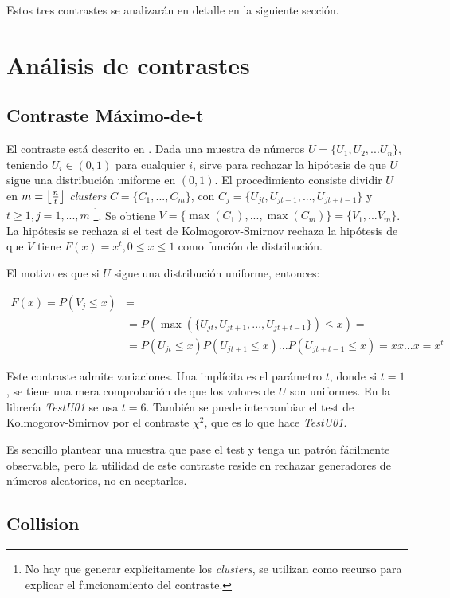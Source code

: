 \documentclass{article}
\DeclarePairedDelimiter\floor{\lfloor}{\rfloor}
\begin{document}
Estos tres contrastes se analizarán en detalle en la siguiente sección.

\section{Análisis de contrastes}

\label{sec:anal}

\subsection{Contraste Máximo-de-t}

El contraste está descrito en \citet{knuth2014art}. Dada una muestra de números \(U=\{U_1,U_2,...U_n\}\), teniendo \(U_i \in (0, 1)\) para cualquier \(i\), sirve para rechazar la hipótesis de que \(U\) sigue una distribución uniforme en \((0,1)\). El procedimiento consiste dividir \(U\) en \(m=\floor*{\frac{n}{t}}\) \emph{clusters} \(C=\{C_1,...,C_m\}\), con \(C_j=\{U_{jt},U_{jt+1},...,U_{jt+t-1}\}\) y \(t\ge1, j=1,...,m\) \footnote{No hay que generar explícitamente los \emph{clusters}, se utilizan como recurso para explicar el funcionamiento del contraste.}. Se obtiene \(V=\{\max(C_1),...,\max(C_m)\}=\{V_1,...V_m\}\). La hipótesis se rechaza si el test de Kolmogorov-Smirnov rechaza la hipótesis de que \(V\) tiene \(F(x)=x^t, 0\le x\le 1\) como función de distribución.

El motivo es que si \(U\) sigue una distribución uniforme, entonces:

\begin{align*}
    F(x)=P(V_j \le x)&=\\
                &=P(\max(\{U_{jt},U_{jt+1},...,U_{jt+t-1}\})\le x)=\\
                &=P(U_{jt}\le x)P(U_{jt+1}\le x)...P(U_{jt+t-1}\le x)=xx...x=x^t
\end{align*}

Este contraste admite variaciones. Una implícita es el parámetro \(t\), donde si \(t=1\), se tiene una mera comprobación de que los valores de \(U\) son uniformes. En la librería \emph{TestU01} se usa \(t=6\). También se puede intercambiar el test de Kolmogorov-Smirnov por el contraste \(\chi^2\), que es lo que hace \emph{TestU01}.

Es sencillo plantear una muestra que pase el test y tenga un patrón fácilmente observable, pero la utilidad de este contraste reside en rechazar generadores de números aleatorios, no en aceptarlos.

\subsection{Collision}
\end{document}
